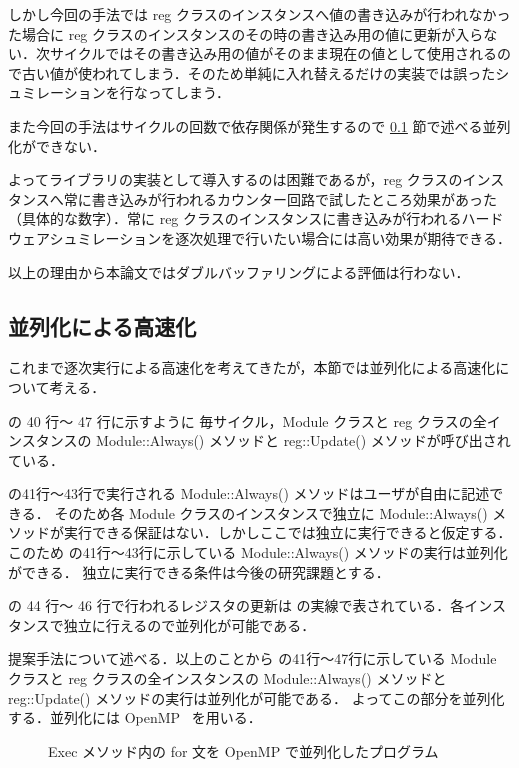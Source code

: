 しかし今回の手法では reg
クラスのインスタンスへ値の書き込みが行われなかった場合に reg
クラスのインスタンスのその時の書き込み用の値に更新が入らない．次サイクルではその書き込み用の値がそのまま現在の値として使用されるので古い値が使われてしまう．そのため単純に入れ替えるだけの実装では誤ったシュミレーションを行なってしまう．

また今回の手法はサイクルの回数で依存関係が発生するので \ref{ss:parallel}
節で述べる並列化ができない．

よってライブラリの実装として導入するのは困難であるが，reg
クラスのインスタンスへ常に書き込みが行われるカウンター回路で試したところ効果があった（具体的な数字）．常に
reg
クラスのインスタンスに書き込みが行われるハードウェアシュミレーションを逐次処理で行いたい場合には高い効果が期待できる．

以上の理由から本論文ではダブルバッファリングによる評価は行わない．

\fi

\subsection{並列化による高速化} \label{ss:parallel}

これまで逐次実行による高速化を考えてきたが，本節では並列化による高速化について考える．

 の 40 行〜 47 行に示すように
毎サイクル，Module クラスと reg クラスの全インスタンスの Module::Always() メソッドと reg::Update() メソッドが呼び出されている．

 の41行〜43行で実行される Module::Always() メソッドはユーザが自由に記述できる．
そのため各 Module クラスのインスタンスで独立に Module::Always() メソッドが実行できる保証はない．しかしここでは独立に実行できると仮定する．
このため の41行〜43行に示している Module::Always() メソッドの実行は並列化ができる．
独立に実行できる条件は今後の研究課題とする．

 の 44 行〜 46 行で行われるレジスタの更新は の実線で表されている．各インスタンスで独立に行えるので並列化が可能である．

提案手法について述べる．以上のことから の41行〜47行に示している
Module クラスと reg クラスの全インスタンスの Module::Always() メソッドと reg::Update() メソッドの実行は並列化が可能である．
よってこの部分を並列化する．並列化には OpenMP~\cite{openmp} を用いる．

\begin{figure}[t]
 
 \caption{Exec メソッド内の for 文を OpenMP で並列化したプログラム}
 \label{src:exec_openmp}
\end{figure}

